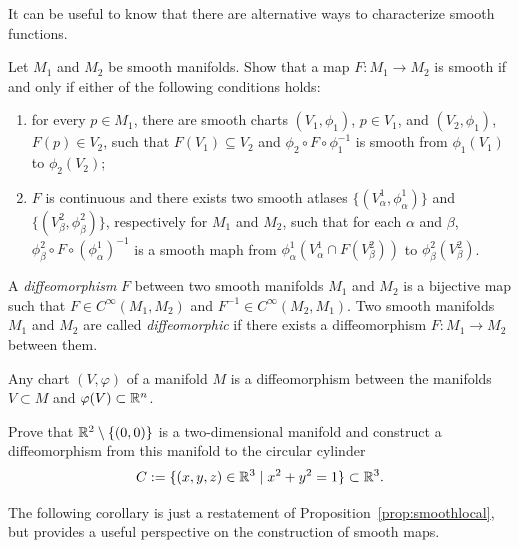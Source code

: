 It can be useful to know that there are alternative ways to characterize smooth functions.
\begin{exercise}\label{prop:eq-def-smooth}
  Let $M_1$ and $M_2$ be smooth manifolds.
  Show that a map $F:M_1\to M_2$ is smooth if and only if either of the following conditions holds:
  \begin{enumerate}
    \item for every $p\in M_1$, there are smooth charts $(V_1,\phi_1)$, $p\in V_1$, and $(V_2,\phi_1)$, $F(p) \in V_2$, such that $F(V_1) \subseteq V_2$ and $\phi_2 \circ F \circ \phi_1^{-1}$ is smooth from $\phi_1(V_1)$ to $\phi_2(V_2)$;
    \item $F$ is continuous and there exists two smooth atlases $\{(V^1_\alpha, \phi^1_\alpha)\}$ and $\{(V^2_\beta, \phi^2_\beta)\}$, respectively for $M_1$ and $M_2$, such that for each $\alpha$ and $\beta$, $\phi^2_\beta \circ F \circ (\phi^1_\alpha)^{-1}$ is a smooth maph from $\phi^1_\alpha(V^1_\alpha \cap F(V_\beta^2))$ to $\phi^2_\beta(V^2_\beta)$.
  \end{enumerate}
\end{exercise}

\begin{definition}
  A \emph{diffeomorphism} $F$ between two smooth manifolds $M_1$ and $M_2$ is a bijective map such that $F\in C^\infty(M_1, M_2)$ and $F^{-1}\in C^\infty(M_2, M_1)$.
  Two smooth manifolds $M_1$ and $M_2$ are called \emph{diffeomorphic} if there exists a diffeomorphism $F:M_1\to M_2$ between them.
\end{definition}

\begin{exercise}
  Any chart $(V, \varphi)$ of a manifold $M$ is a diffeomorphism between the manifolds $V\subset M$ and $\varphi(V)\subset\mathbb{R}^n$.
\end{exercise}

\begin{exercise}
  Prove that $\mathbb{R}^2\setminus\{(0,0)\}$ is a two-dimensional manifold and construct a diffeomorphism from this manifold to the circular cylinder
  \begin{equation}
    C := \{ (x,y,z)\in\mathbb{R}^3 \mid x^2+y^2 = 1\}\subset\mathbb{R}^3.
  \end{equation}
\end{exercise}

The following corollary is just a restatement of Proposition~\ref{prop:smoothlocal}, but provides a useful perspective on the construction of smooth maps.

